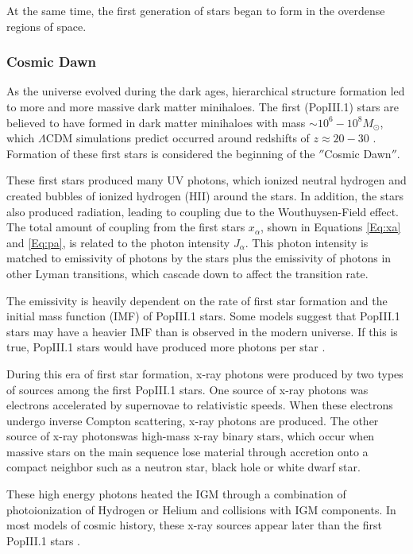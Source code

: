 At the same time, the first generation of stars began to form in the overdense regions of space. 

\subsubsection{Cosmic Dawn}
As the universe evolved during the dark ages, hierarchical structure formation led to more and more massive dark matter minihaloes. The first (PopIII.1) stars are believed to have formed in dark matter minihaloes with mass $\sim 10^6 - 10^8 M_{\odot}$, which $\Lambda$CDM simulations predict occurred around redshifts of $z \approx 20-30$ \cite{bromm_2013}. Formation of these first stars is considered the beginning of the $''$Cosmic Dawn$''$. 


These first stars produced many UV photons, which ionized neutral hydrogen and created bubbles of ionized hydrogen (HII) around the stars. In addition, the stars also produced \lya  radiation, leading to coupling due to the Wouthuysen-Field effect. The total amount of coupling from the first stars $x_\alpha$, shown in Equations \ref{Eq:xa} and \ref{Eq:pa}, is related to the \lya  photon intensity $J_\alpha$. This photon intensity is matched to emissivity of \lya  photons by the stars  plus the emissivity of photons in other Lyman transitions, which cascade down to affect the \lya  transition rate. 

The emissivity is heavily dependent on the rate of first star formation and the initial mass function (IMF) of PopIII.1 stars. Some models suggest that PopIII.1 stars may have a heavier IMF than is observed in the modern universe. If this is true, PopIII.1 stars would have produced more \lya  photons per star \cite{natarajan_2014}. 

During this era of first star formation, x-ray photons were produced by two types of sources among the first PopIII.1 stars. One source of x-ray photons was electrons accelerated by supernovae to relativistic speeds. When these electrons undergo inverse Compton scattering, x-ray photons are produced. The other source of x-ray photonswas high-mass x-ray binary stars, which occur when massive stars on the main sequence lose material through accretion onto a compact neighbor such as a neutron star, black hole or white dwarf star. 

These high energy photons heated the IGM through a combination of photoionization of Hydrogen or Helium and collisions with IGM components. In most models of cosmic history, these x-ray sources appear later than the first PopIII.1 stars \cite{furlanetto_2006}. 

